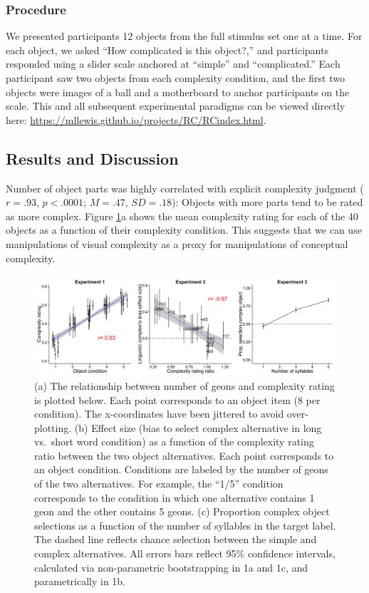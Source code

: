\documentclass[man]{apa2}
\begin{document}
\subsubsection{Procedure}
We presented participants 12 objects from the full stimulus set one at a time. For each object, we asked ``How complicated is this object?,'' and participants responded using a slider scale anchored at ``simple'' and ``complicated.'' Each participant saw two objects from each complexity condition, and the first two objects were images of a ball and a motherboard to anchor participants on the scale. This and all subsequent experimental paradigms can be viewed directly here: \url{https://mllewis.github.io/projects/RC/RCindex.html}.

\subsection{Results and Discussion}
Number of object parts was highly correlated with explicit complexity judgment ($r = .93$, $p < .0001$; $M = .47$, $SD = .18$): Objects with more parts tend to be rated as more complex. Figure \ref{fig:study1_plots}a shows the mean complexity rating for each of the 40 objects as a function of their complexity condition. This suggests that we can use manipulations of visual complexity as a proxy for manipulations of conceptual complexity. 

\begin{figure}[t]
 \begin{center} 
  \includegraphics[width=6in]{figures/study1_plots.png} 
  \caption{ \label{fig:study1_plots} (a) The relationship between number of geons and complexity rating is plotted below. Each point corresponds to an object item (8 per condition). The x-coordinates have been jittered to avoid over-plotting. (b) Effect size (bias to select complex alternative in long vs.\ short word condition) as a function of the complexity rating ratio between the two object alternatives. Each point corresponds to an object condition. Conditions are labeled by the number of geons of the two alternatives. For example, the ``1/5'' condition corresponds to the condition in which one alternative contains 1 geon and the other contains 5 geons. (c) Proportion complex object selections as a function of the number of syllables in the target label. The dashed line reflects chance selection between the simple and complex alternatives. All errors bars reflect 95\% confidence intervals, calculated via non-parametric bootstrapping in 1a and 1c, and parametrically in 1b.
 } 
 \end{center} 
\end{figure}	
\end{document}
